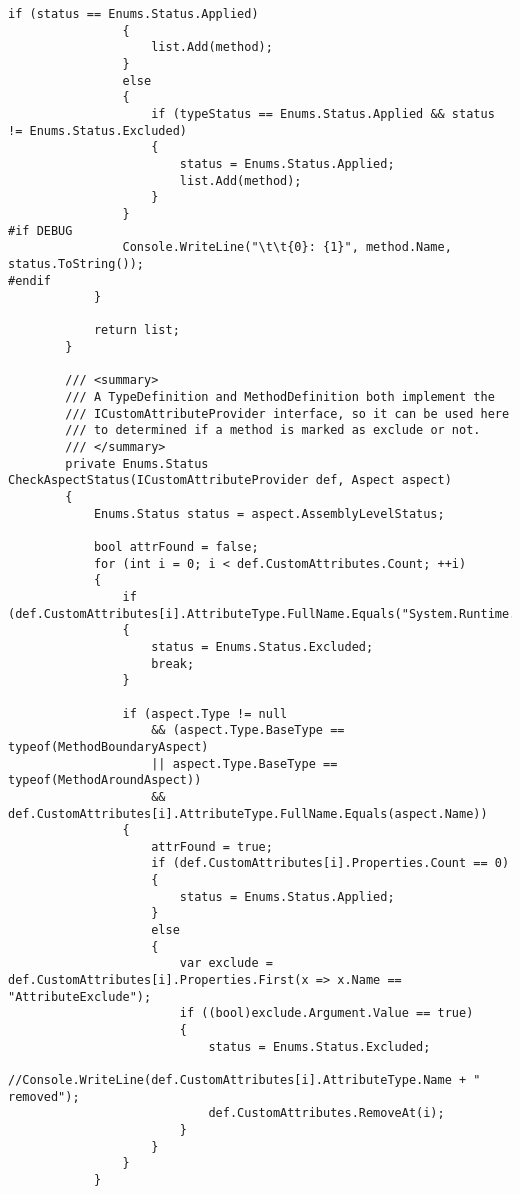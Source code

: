 \begin{lstlisting}[caption={../buffalo/Weaver.cs}, label=../buffalo/Weaver.cs, frame=tb, basicstyle=\scriptsize]
                if (status == Enums.Status.Applied)
                {
                    list.Add(method);
                }
                else
                {
                    if (typeStatus == Enums.Status.Applied && status != Enums.Status.Excluded)
                    {
                        status = Enums.Status.Applied;
                        list.Add(method);
                    }
                }
#if DEBUG
                Console.WriteLine("\t\t{0}: {1}", method.Name, status.ToString());
#endif
            }

            return list;
        }

        /// <summary>
        /// A TypeDefinition and MethodDefinition both implement the
        /// ICustomAttributeProvider interface, so it can be used here
        /// to determined if a method is marked as exclude or not.
        /// </summary>
        private Enums.Status CheckAspectStatus(ICustomAttributeProvider def, Aspect aspect)
        {
            Enums.Status status = aspect.AssemblyLevelStatus;

            bool attrFound = false;
            for (int i = 0; i < def.CustomAttributes.Count; ++i)
            {
                if (def.CustomAttributes[i].AttributeType.FullName.Equals("System.Runtime.CompilerServices.CompilerGeneratedAttribute"))
                {
                    status = Enums.Status.Excluded;
                    break;
                }

                if (aspect.Type != null 
                    && (aspect.Type.BaseType == typeof(MethodBoundaryAspect)
                    || aspect.Type.BaseType == typeof(MethodAroundAspect))
                    && def.CustomAttributes[i].AttributeType.FullName.Equals(aspect.Name))
                {
                    attrFound = true;
                    if (def.CustomAttributes[i].Properties.Count == 0)
                    {
                        status = Enums.Status.Applied;
                    }
                    else
                    {
                        var exclude = def.CustomAttributes[i].Properties.First(x => x.Name == "AttributeExclude");
                        if ((bool)exclude.Argument.Value == true)
                        {
                            status = Enums.Status.Excluded;
                            //Console.WriteLine(def.CustomAttributes[i].AttributeType.Name + " removed");
                            def.CustomAttributes.RemoveAt(i);
                        }
                    }
                }
            }


\end{lstlisting}
